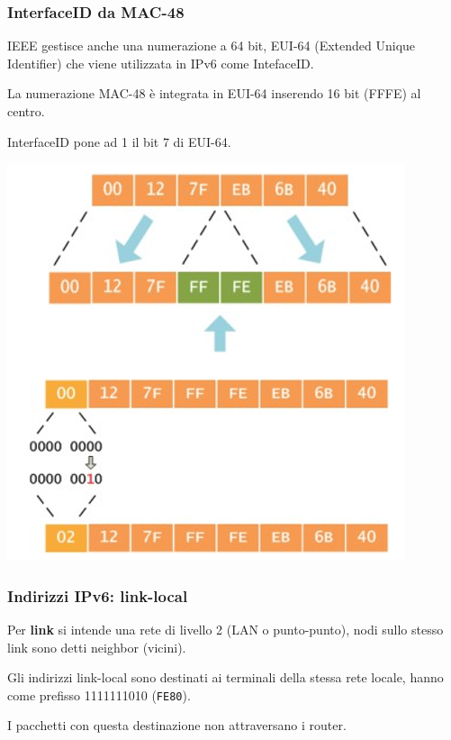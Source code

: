         \subsubsection{InterfaceID da MAC-48}
            IEEE gestisce anche una numerazione a 64 bit, EUI-64 (Extended Unique Identifier) che viene utilizzata in IPv6 come IntefaceID.
        
            La numerazione MAC-48 è integrata in EUI-64 inserendo 16 bit (FFFE) al centro.
        
            InterfaceID pone ad 1 il bit 7 di EUI-64.

            \begin{center}
                \includegraphics[scale=0.4]{chapters/4/assets/schema_j.png}
            \end{center}

        \subsubsection{Indirizzi IPv6: link-local}
            Per \textbf{link} si intende una rete di livello 2 (LAN o punto-punto), nodi sullo stesso link sono detti neighbor (vicini).
            
            Gli indirizzi link-local sono destinati ai terminali della stessa rete locale, hanno come prefisso 1111111010 (\verb:FE80:).
        
            I pacchetti con questa destinazione non attraversano i router.
        
